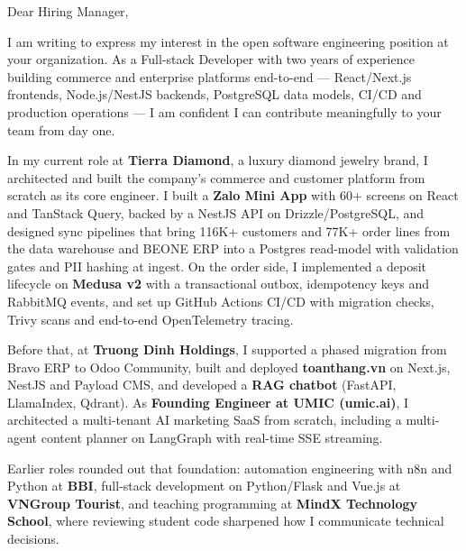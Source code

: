 \documentclass[10pt, letterpaper]{article}
\begin{document}
\pagestyle{empty}

\newcommand{\cvname}{VINH-KHUONG TRUONG}


\vspace{0.5cm}

\begin{onecolentry}

Dear Hiring Manager,

\vspace{0.2cm}

I am writing to express my interest in the open software engineering position at your organization. As a Full-stack Developer with two years of experience building commerce and enterprise platforms end-to-end --- React/Next.js frontends, Node.js/NestJS backends, PostgreSQL data models, CI/CD and production operations --- I am confident I can contribute meaningfully to your team from day one.

\vspace{0.2cm}

In my current role at \textbf{Tierra Diamond}, a luxury diamond jewelry brand, I architected and built the company's commerce and customer platform from scratch as its core engineer. I built a \textbf{Zalo Mini App} with 60+ screens on React and TanStack Query, backed by a NestJS API on Drizzle/PostgreSQL, and designed sync pipelines that bring 116K+ customers and 77K+ order lines from the data warehouse and BEONE ERP into a Postgres read-model with validation gates and PII hashing at ingest. On the order side, I implemented a deposit lifecycle on \textbf{Medusa v2} with a transactional outbox, idempotency keys and RabbitMQ events, and set up GitHub Actions CI/CD with migration checks, Trivy scans and end-to-end OpenTelemetry tracing.

\vspace{0.2cm}

Before that, at \textbf{Truong Dinh Holdings}, I supported a phased migration from Bravo ERP to Odoo Community, built and deployed \textbf{toanthang.vn} on Next.js, NestJS and Payload CMS, and developed a \textbf{RAG chatbot} (FastAPI, LlamaIndex, Qdrant). As \textbf{Founding Engineer at UMIC (umic.ai)}, I architected a multi-tenant AI marketing SaaS from scratch, including a multi-agent content planner on LangGraph with real-time SSE streaming.

\vspace{0.2cm}

Earlier roles rounded out that foundation: automation engineering with n8n and Python at \textbf{BBI}, full-stack development on Python/Flask and Vue.js at \textbf{VNGroup Tourist}, and teaching programming at \textbf{MindX Technology School}, where reviewing student code sharpened how I communicate technical decisions.


\end{onecolentry}
\end{document}
